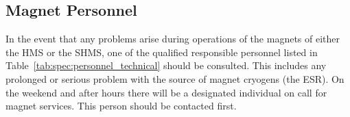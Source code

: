 \subsection {Magnet Personnel}
In the event that any problems arise during operations of the magnets
of either the HMS or the SHMS,
one of the qualified responsible personnel listed in
Table~\ref{tab:spec:personnel_technical} should be consulted.  This includes any prolonged
or serious problem with the source of magnet cryogens (the ESR).
On the weekend and after hours there
will be a designated individual on call for magnet services. This person should be
contacted first.


%
%
%
